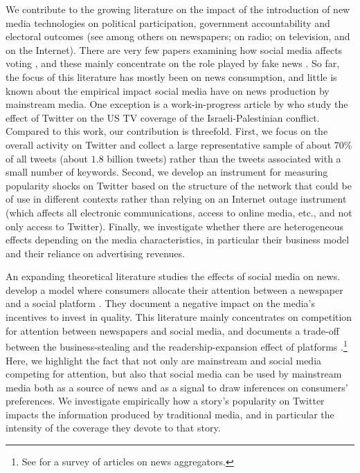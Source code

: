 We contribute to the growing literature on the impact of the introduction of new media technologies on political participation, government accountability and electoral outcomes (see among others \citet{Gentzkowetal2011,SnyderStromberg2010} on newspapers; \citet{Stromberg2004} on radio; \citet{Gentzkow2006,AngelucciCage2019,AngelucciCageSinkinson2020} on television, and \citet{BoxellGentzkowShapiro2018,Gavazzaetal2019} on the Internet). There are very few papers examining how social media affects voting \citep[for a review of the literature see][]{Zhuravskayaetal2020}, and these mainly concentrate on the role played by fake news \citep{AllcottGentzkow2017}. So far, the focus of this literature has mostly been on news consumption, and little is known about the empirical impact social media have on news production by mainstream media. One exception is a work-in-progress article by \citet{HatteMadinierZhuravskaya2020}  who study the effect of Twitter on the US  TV coverage of the Israeli-Palestinian conflict. Compared to this work, our contribution is threefold. First, we focus on the overall activity on Twitter and collect a large representative sample of about 70\% of all tweets (about $1.8$ billion tweets) rather than the tweets associated with a small number of keywords. Second, we develop an instrument for measuring popularity shocks on Twitter based on the structure of the network that could be of use in different contexts rather than relying on an Internet outage instrument (which affects all electronic communications, access to online media, etc., and not only access to Twitter). Finally, we investigate whether there are heterogeneous effects depending on the media characteristics, in particular their business model and their reliance on advertising revenues.

An expanding theoretical literature studies the effects of social media on news.  develop a model where consumers allocate their attention between a newspaper and a social platform \citep[see also][for a theory of news coverage in environments of information abundance]{AlaouiGermano2020}. They document a negative impact on the media's incentives to invest in quality. This literature mainly concentrates on competition for attention between newspapers and social media, and documents a trade-off between the business-stealing and the readership-expansion effect of platforms \citep{JeonNasr2016}.\footnote{See \citet{Jeon2018} for a survey of articles on news aggregators.}  Here, we highlight the fact that not only are mainstream and social media competing for attention, but also that social media can be used by mainstream media both as a source of news and as a signal to draw inferences on consumers' preferences. We investigate empirically how a story's popularity on Twitter impacts the information produced by traditional media, and in particular the intensity of the coverage they devote to that story.

